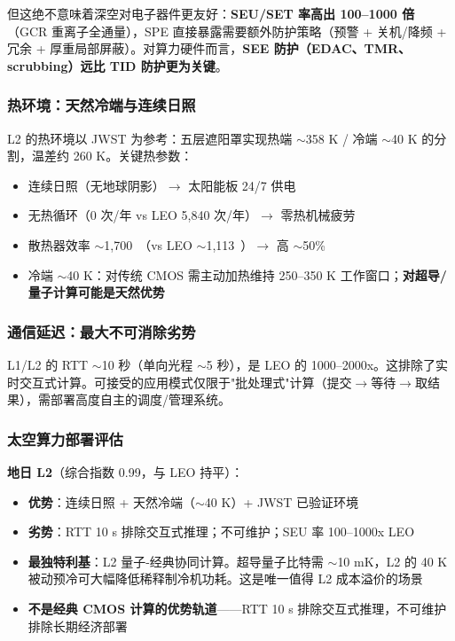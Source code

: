 但这绝不意味着深空对电子器件更友好：\textbf{SEU/SET 率高出 100--1000 倍}（GCR 重离子全通量），SPE 直接暴露需要额外防护策略（预警 + 关机/降频 + 冗余 + 厚重局部屏蔽）。对算力硬件而言，\textbf{SEE 防护（EDAC、TMR、scrubbing）远比 TID 防护更为关键}。

\subsubsection{热环境：天然冷端与连续日照}

L2 的热环境以 JWST 为参考：五层遮阳罩实现热端 $\sim$358 K / 冷端 $\sim$40 K 的分割，温差约 260 K。关键热参数：

\begin{itemize}
    \item 连续日照（无地球阴影）$\rightarrow$ 太阳能板 24/7 供电
    \item 无热循环（0 次/年 vs LEO 5,840 次/年）$\rightarrow$ 零热机械疲劳
    \item 散热器效率 $\sim$1,700~\wpm（vs LEO $\sim$1,113~\wpm）$\rightarrow$ 高 $\sim$50\%
    \item 冷端 $\sim$40 K：对传统 CMOS 需主动加热维持 250--350 K 工作窗口；\textbf{对超导/量子计算可能是天然优势}
\end{itemize}

\subsubsection{通信延迟：最大不可消除劣势}

L1/L2 的 RTT $\sim$10 秒（单向光程 $\sim$5 秒），是 LEO 的 1000--2000x。这排除了实时交互式计算。可接受的应用模式仅限于"批处理式"计算（提交$\rightarrow$等待$\rightarrow$取结果），需部署高度自主的调度/管理系统。

\subsubsection{太空算力部署评估}

\textbf{地日 L2}（综合指数 0.99，与 LEO 持平）：
\begin{itemize}
    \item \textbf{优势}：连续日照 + 天然冷端（$\sim$40 K）+ JWST 已验证环境
    \item \textbf{劣势}：RTT 10 s 排除交互式推理；不可维护；SEU 率 100--1000x LEO
    \item \textbf{最独特利基}：L2 量子-经典协同计算。超导量子比特需 $\sim$10 mK，L2 的 40 K 被动预冷可大幅降低稀释制冷机功耗。这是唯一值得 L2 成本溢价的场景
    \item \textbf{不是经典 CMOS 计算的优势轨道}——RTT 10 s 排除交互式推理，不可维护排除长期经济部署
\end{itemize}

